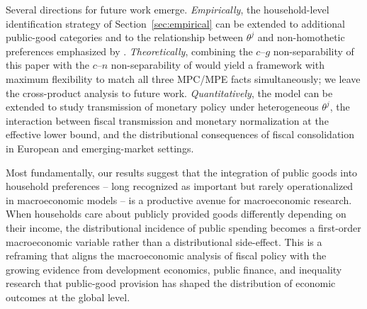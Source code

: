 Several directions for future work emerge. \emph{Empirically}, the
household-level identification strategy of Section~\ref{sec:empirical} can be
extended to additional public-good categories and to the relationship between
$\theta^{j}$ and non-homothetic preferences emphasized by
\citet{BarthelFrancois2025}. \emph{Theoretically}, combining the $c$--$g$
non-separability of this paper with the $c$--$n$ non-separability of \BHL{}
would yield a framework with maximum flexibility to match all three MPC/MPE
facts simultaneously; we leave the cross-product analysis to future work.
\emph{Quantitatively}, the model can be extended to study transmission of
monetary policy under heterogeneous $\theta^{j}$, the interaction between
fiscal transmission and monetary normalization at the effective lower bound,
and the distributional consequences of fiscal consolidation in European and
emerging-market settings.

Most fundamentally, our results suggest that the integration of public goods
into household preferences -- long recognized as important but rarely
operationalized in macroeconomic models -- is a productive avenue for
macroeconomic research. When households care about publicly provided goods
differently depending on their income, the distributional incidence of public
spending becomes a first-order macroeconomic variable rather than a
distributional side-effect. This is a reframing that aligns the macroeconomic
analysis of fiscal policy with the growing evidence from development
economics, public finance, and inequality research that public-good provision
has shaped the distribution of economic outcomes at the global level.
